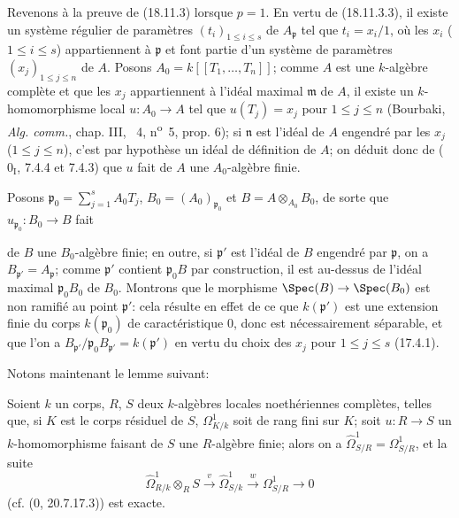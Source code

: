 Revenons à la preuve de (18.11.3) lorsque $p=1$. En vertu de (18.11.3.3), il existe un système régulier de paramètres $(t_i)_{1\leq i\leq s}$ de $A_{\mathfrak p}$ tel que $t_i=x_i/1$, où les $x_i$ ($1\leq i\leq s$) appartiennent à $\mathfrak p$ et font partie d'un système de paramètres $(x_j)_{1\leq j\leq n}$ de $A$. Posons $A_0=k[[T_1,\ldots,T_n]]$; comme $A$ est une $k$-algèbre complète et que les $x_j$ appartiennent à l'idéal maximal $\mathfrak m$ de $A$, il existe un $k$-homomorphisme local $u:A_0\to A$ tel que $u(T_j)=x_j$ pour $1\leq j\leq n$ (Bourbaki, \emph{Alg. comm.}, chap. III, \textsection~4, n\textsuperscript{o}~5, prop. 6); si $\mathfrak n$ est l'idéal de $A$ engendré par les $x_j$ ($1\leq j\leq n$), c'est par hypothèse un idéal de définition de $A$; on déduit donc de ($0_{\mathrm I}$, 7.4.4 et 7.4.3) que $u$ fait de $A$ une $A_0$-algèbre finie.

Posons $\mathfrak p_0=\sum_{j=1}^s A_0T_j$, $B_0=(A_0)_{\mathfrak p_0}$ et $B=A\otimes_{A_0}B_0$, de sorte que $u_{\mathfrak p_0}:B_0\to B$ fait


de $B$ une $B_0$-algèbre finie; en outre, si $\mathfrak p'$ est l'idéal de $B$ engendré par $\mathfrak p$, on a $B_{\mathfrak p'}=A_{\mathfrak p}$; comme $\mathfrak p'$ contient $\mathfrak p_0B$ par construction, il est au-dessus de l'idéal maximal $\mathfrak p_0B_0$ de $B_0$. Montrons que le morphisme $\Spec(B)\to\Spec(B_0)$ est non ramifié au point $\mathfrak p'$: cela résulte en effet de ce que $k(\mathfrak p')$ est une extension finie du corps $k(\mathfrak p_0)$ de caractéristique 0, donc est nécessairement séparable, et que l'on a $B_{\mathfrak p'}/\mathfrak p_0B_{\mathfrak p'}=k(\mathfrak p')$ en vertu du choix des $x_j$ pour $1\leq j\leq s$ (17.4.1).

Notons maintenant le lemme suivant:

\begin{lemma}[18.11.3.5]
\label{IV.18.11.3.5}
Soient $k$ un corps, $R$, $S$ deux $k$-algèbres locales noethériennes complètes, telles que, si $K$ est le corps résiduel de $S$, $\Omega^1_{K/k}$ soit de rang fini sur $K$; soit $u:R\to S$ un $k$-homomorphisme faisant de $S$ une $R$-algèbre finie; alors on a $\hat{\Omega}^1_{S/R}=\Omega^1_{S/R}$, et la suite
\begin{equation}
\label{IV.18.11.3.6}
\tag{18.11.3.6}
  \hat{\Omega}^1_{R/k}\otimes_R S\xrightarrow{v}\hat{\Omega}^1_{S/k}\xrightarrow{w}\Omega^1_{S/R}\to0
\end{equation}
(cf. (0, 20.7.17.3)) est exacte.
\end{lemma}

